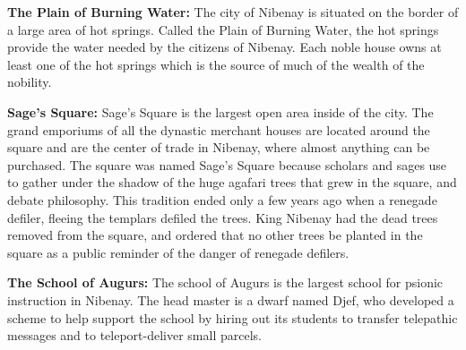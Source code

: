 {	\textbf{The Plain of Burning Water:} The city of Nibenay is situated on the border of a large area of hot springs. Called the Plain of Burning Water, the hot springs provide the water needed by the citizens of Nibenay. Each noble house owns at least one of the hot springs which is the source of much of the wealth of the nobility.

	\textbf{Sage's Square:} Sage's Square is the largest open area inside of the city. The grand emporiums of all the dynastic merchant houses are located around the square and are the center of trade in Nibenay, where almost anything can be purchased. The square was named Sage's Square because scholars and sages use to gather under the shadow of the huge agafari trees that grew in the square, and debate philosophy. This tradition ended only a few years ago when a renegade defiler, fleeing the templars defiled the trees. King Nibenay had the dead trees removed from the square, and ordered that no other trees be planted in the square as a public reminder of the danger of renegade defilers.

	\textbf{The School of Augurs:} The school of Augurs is the largest school for psionic instruction in Nibenay. The head master is a dwarf named Djef, who developed a scheme to help support the school by hiring out its students to transfer telepathic messages and to teleport-deliver small parcels.
}
